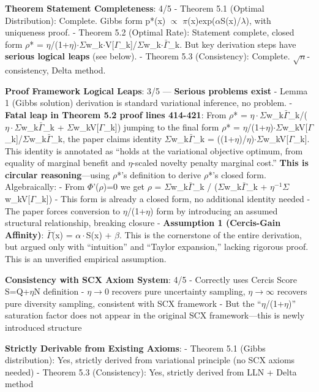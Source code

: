 \documentclass[
  12pt,
]{article}
\begin{document}
\textbf{Theorem Statement Completeness}: 4/5
- Theorem 5.1 (Optimal Distribution): Complete. Gibbs form p*(x) $\propto$ $\pi$(x)exp($\alpha$S(x)/$\lambda$), with uniqueness proof.
- Theorem 5.2 (Optimal Rate): Statement complete, closed form $\rho$* = $\eta$/(1+$\eta$)$\cdot\Sigma$w\_k$\cdot$V[$\Gamma$\_k]/$\Sigma$w\_k$\cdot\bar{\Gamma}$\_k. But key derivation steps have \textbf{serious logical leaps} (see below).
- Theorem 5.3 (Consistency): Complete. $\sqrt{n}$-consistency, Delta method.

\textbf{Proof Framework Logical Leaps}: 3/5 --- \textbf{Serious problems exist}
- Lemma 1 (Gibbs solution) derivation is standard variational inference, no problem.
- \textbf{Fatal leap in Theorem 5.2 proof lines 414-421}: From $\rho$* = $\eta\cdot\Sigma$w\_k$\bar{\Gamma}$\_k/($\eta\cdot\Sigma$w\_k$\bar{\Gamma}$\_k + $\Sigma$w\_kV[$\Gamma$\_k]) jumping to the final form $\rho$* = $\eta$/(1+$\eta$)$\cdot\Sigma$w\_kV[$\Gamma$\_k]/$\Sigma$w\_k$\bar{\Gamma}$\_k, the paper claims identity $\Sigma$w\_k$\bar{\Gamma}$\_k = ((1+$\eta$)/$\eta$)$\cdot\Sigma$w\_kV[$\Gamma$\_k]. This identity is annotated as ``holds at the variational objective optimum, from equality of marginal benefit and $\eta$-scaled novelty penalty marginal cost.'' \textbf{This is circular reasoning}---using $\rho$*'s definition to derive $\rho$*'s closed form. Algebraically:
- From $\Phi$'($\rho$)=0 we get $\rho$ = $\Sigma$w\_k$\bar{\Gamma}$\_k / ($\Sigma$w\_k$\bar{\Gamma}$\_k + $\eta^{-1}\Sigma$w\_kV[$\Gamma$\_k])
- This form is already a closed form, no additional identity needed
- The paper forces conversion to $\eta$/(1+$\eta$) form by introducing an assumed structural relationship, breaking closure
- \textbf{Assumption 1 (Cercis-Gain Affinity)}: $\bar{\Gamma}$(x) = $\alpha\cdot$S(x) + $\beta$. This is the cornerstone of the entire derivation, but argued only with ``intuition'' and ``Taylor expansion,'' lacking rigorous proof. This is an unverified empirical assumption.

\textbf{Consistency with SCX Axiom System}: 4/5
- Correctly uses Cercis Score S=Q+$\eta$N definition
- $\eta\to0$ recovers pure uncertainty sampling, $\eta\to\infty$ recovers pure diversity sampling, consistent with SCX framework
- But the ``$\eta$/(1+$\eta$)'' saturation factor does not appear in the original SCX framework---this is newly introduced structure

\textbf{Strictly Derivable from Existing Axioms}:
- Theorem 5.1 (Gibbs distribution): Yes, strictly derived from variational principle (no SCX axioms needed)
- Theorem 5.3 (Consistency): Yes, strictly derived from LLN + Delta method
\end{document}
